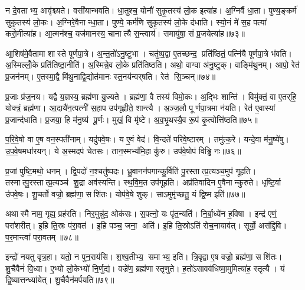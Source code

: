 न दे॒वताभ्य॒ आवृ॑श्च्यते।
वसी॑यान्भवति।
धा॒तुश्च॒ योनौ॑ सुकृ॒तस्य॑ लो॒क इत्या॑ह।
अ॒ग्निर्वै धा॒ता।
पुण्य॒ङ्कर्म॑ सुकृ॒तस्य॑ लो॒कः।
अ॒ग्निरे॒वैनान्धा॒ता।
पुण्ये॒ कर्म॑णि सुकृ॒तस्य॑ लो॒के द॑धाति।
स्यो॒नं मे॑ स॒ह पत्या॑ करो॒मीत्या॑ह।
आ॒त्मन॑श्च॒ यज॑मानस्य॒ चानात्यै स॒न्त्वाय॑।
समायु॑षा॒ सं प्र॒जयेत्या॑ह॥७३॥

आ॒शिष॑मे॒वैतामा शास्ते पूर्णपा॒त्रे।
अ॒न्त॒तो॑ऽनु॒ष्टुभा।
चतु॑ष्प॒द्वा ए॒तच्छन्द॒ प्रति॑ष्ठितं॒ पत्नि॑यै पूर्णपा॒त्रे भ॑वति।
अ॒स्मिल्लोँ॒के प्रति॑तिष्ठा॒नीति॑।
अ॒स्मिन्ने॒व लो॒के प्रति॑तिष्ठति।
अथो॒ वाग्वा अ॑नु॒ष्टुक्।
वाङ्मि॑थु॒नम्।
आपो॒ रेत॑ प्र॒जन॑नम्।
ए॒तस्मा॒द्वै मि॑थु॒नाद्वि॒द्योत॑मानः स्त॒नय॑न्वर्‌षति।
रेत॑ सि॒ञ्चन्॥७४॥

प्र॒जाः प्र॑ज॒नय\sn{}।
यद्वै य॒ज्ञस्य॒ ब्रह्म॑णा यु॒ज्यते।
ब्रह्म॑णा॒ वै तस्य॑ विमो॒कः।
अ॒द्भिः शान्ति॑।
विमु॑क्तं॒ वा ए॒तर्‌हि॒ योक्त्रं॒ ब्रह्म॑णा।
आ॒दायै॑न॒त्पत्नी॑ स॒हाप उप॑गृह्णीते॒ शान्त्यै।
अ॒ञ्ज॒लौ पूर्णपा॒त्रमा न॑यति।
रेत॑ ए॒वास्यां प्र॒जान्द॑धाति।
प्र॒जया॒ हि म॑नु॒ष्य॑ पू॒र्णः।
मुखं॒ वि मृ॑ष्टे।
अ॒व॒भृ॒थस्यै॒व रू॒पं कृ॒त्वोत्ति॑ष्ठति॥७५॥\anuvakamend[स॒वि॒तृप्र॑सूतो यथादेव॒तं प्र॒जयेत्या॑ह सि॒ञ्चन्मृ॑ष्ट॒ एकं च]

प॒रि॒वे॒षो वा ए॒ष वन॒स्पती॑नाम्।
यदु॑पवे॒षः।
य ए॒वं वेद॑।
वि॒न्दते॑ परिवे॒ष्टारम्।
तमु॑त्क॒रे।
यन्दे॒वा म॑नु॒ष्ये॑षु।
उ॒प॒वे॒षमधा॑रयन्।
ये अ॒स्मदप॑ चेतसः।
तान॒स्मभ्य॑मि॒हा कु॑रु।
उप॑वे॒षोप॑ विड्ढि नः॥७६॥

प्र॒जां पुष्टि॒मथो॒ धनम्।
द्वि॒पदो॑ न॒श्चतु॑ष्पदः।
ध्रु॒वानन॑पगान्कु॒र्विति॑ पु॒रस्तात्प्र॒त्यञ्च॒मुप॑ गूहति।
तस्मात्पु॒रस्तात्प्र॒त्यञ्च॑ शू॒द्रा अव॑स्यन्ति।
स्थ॒वि॒म॒त उप॑गूहति।
अप्र॑तिवादिन ए॒वैनान्कुरुते।
धृष्टि॒र्वा उ॑पवे॒षः।
शु॒चर्तो वज्रो॒ ब्रह्म॑णा॒ सशि॑तः।
योप॑वे॒षे शुक्।
साऽमुमृ॑च्छतु॒ यं द्वि॒ष्म इति॑॥७७॥

अथास्मै नाम॒ गृह्य॒ प्रह॑रति।
निर॒मुन्नु॑द॒ ओक॑सः।
स॒पत्नो॒ यः पृ॑त॒न्यति॑।
नि॒र्बा॒ध्ये॑न ह॒विषा।
इन्द्र॑ एणं॒ परा॑शरीत्।
इ॒हि ति॒स्रः प॑रा॒वत॑।
इ॒हि पञ्च॒ जना॒ अति॑।
इ॒हि ति॒स्रोऽति॑ रोच॒नायाव॑त्।
सूर्यो॒ अस॑द्दि॒वि।
प॒र॒मान्त्वा॑ परा॒वतम्॥७८॥

इन्द्रो॑ नयतु वृत्र॒हा।
यतो॒ न पुन॒राय॑सि।
श॒श्व॒तीभ्य॒ समाभ्य॒ इति॑।
त्रि॒वृद्वा ए॒ष वज्रो॒ ब्रह्म॑णा॒ सशि॑तः।
शु॒चैवैनं॑ वि॒ध्वा।
ए॒भ्यो लो॒केभ्यो॑ नि॒र्णुद्य॑।
वज्रे॑ण॒ ब्रह्म॑णा स्तृणुते।
ह॒तो॑ऽसावव॑धिष्मा॒मुमित्या॑ह॒ स्तृत्यै।
यं द्वि॒ष्यात्तन्ध्या॑येत्।
शु॒चैवैन॑मर्पयति॥७९॥




\clearpage
{}
\setcounter{anuvakam}{0}

